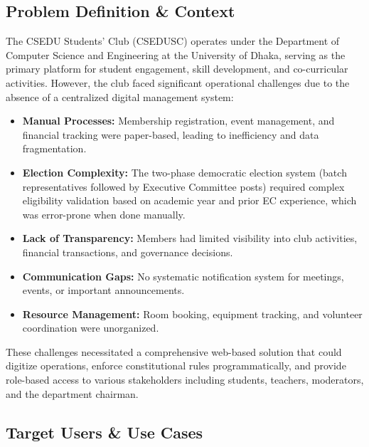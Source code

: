 \documentclass[12pt,a4paper]{article}
\begin{document}
\subsection{Problem Definition \& Context}

The CSEDU Students' Club (CSEDUSC) operates under the Department of Computer Science and Engineering at the University of Dhaka, serving as the primary platform for student engagement, skill development, and co-curricular activities. However, the club faced significant operational challenges due to the absence of a centralized digital management system:

\begin{itemize}[noitemsep]
  \item \textbf{Manual Processes:} Membership registration, event management, and financial tracking were paper-based, leading to inefficiency and data fragmentation.
  \item \textbf{Election Complexity:} The two-phase democratic election system (batch representatives followed by Executive Committee posts) required complex eligibility validation based on academic year and prior EC experience, which was error-prone when done manually.
  \item \textbf{Lack of Transparency:} Members had limited visibility into club activities, financial transactions, and governance decisions.
  \item \textbf{Communication Gaps:} No systematic notification system for meetings, events, or important announcements.
  \item \textbf{Resource Management:} Room booking, equipment tracking, and volunteer coordination were unorganized.
\end{itemize}

These challenges necessitated a comprehensive web-based solution that could digitize operations, enforce constitutional rules programmatically, and provide role-based access to various stakeholders including students, teachers, moderators, and the department chairman.

\clearpage
\subsection{Target Users \& Use Cases}
\end{document}
